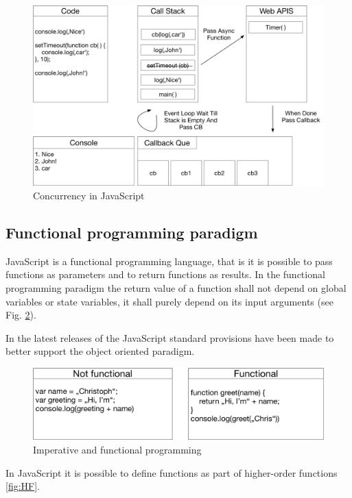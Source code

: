 \begin{figure}[H]
	\centering
	\includegraphics[width=1.0\linewidth]{bilder/grundlagen/Concurrency.png}
	\caption{Concurrency in JavaScript}
	\label{fig:CC}
\end{figure}

\subsection{Functional programming paradigm}

JavaScript is a functional programming language, that is it is possible to 
pass functions as parameters and to return
functions as results. In the functional programming paradigm the return value of a function shall not depend on global variables or state variables, it shall purely depend on its input arguments (see Fig. \ref{fig:FP})\cite{Steyer2014JavaScript}.

In the latest releases of the JavaScript standard provisions have been made to better support the object
oriented paradigm.

\begin{figure}[H]
	\centering
	\includegraphics[scale=0.6]{bilder/grundlagen/fp.png}
	\caption{Imperative and functional programming}
	\label{fig:FP}
\end{figure}

In JavaScript it is possible to define functions as part of higher-order functions  \ref{fig:HF}. 

